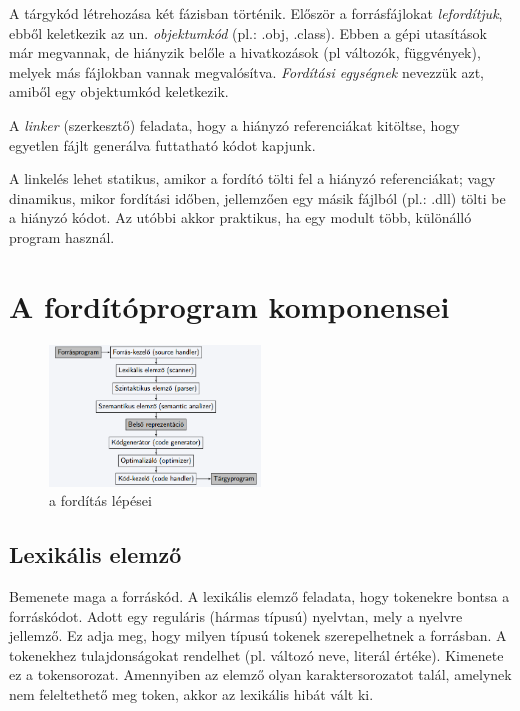 \documentclass[margin=0px]{article}
\begin{document}
	A tárgykód létrehozása két fázisban történik. Először a forrásfájlokat \textit{lefordítjuk}, ebből keletkezik az un. \textit{objektumkód} (pl.: .obj, .class). Ebben a gépi utasítások már megvannak, de hiányzik belőle a hivatkozások (pl változók, függvények), melyek más fájlokban vannak megvalósítva. \textit{Fordítási egységnek} nevezzük azt, amiből egy objektumkód keletkezik.
	
	 A \textit{linker} (szerkesztő) feladata, hogy a hiányzó referenciákat kitöltse, hogy egyetlen fájlt generálva futtatható kódot kapjunk.
	
	 A linkelés lehet statikus, amikor a fordító tölti fel a hiányzó referenciákat; vagy dinamikus, mikor fordítási időben, jellemzően egy másik fájlból (pl.: .dll) tölti be a hiányzó kódot. Az utóbbi akkor praktikus, ha egy modult több, különálló program használ.
	

\section{A fordítóprogram komponensei}	
	\begin{figure}[H]
		\centering
		\includegraphics[width=0.5\textwidth]{img/forditas_teljes_folyamata.png}
		\caption{a fordítás lépései}
		\label{fig:forditas_teljes_folyamatabra}
	\end{figure}


\subsection{Lexikális elemző}
	
	Bemenete maga a forráskód. A lexikális elemző feladata, hogy tokenekre bontsa a forráskódot. Adott egy reguláris (hármas típusú) nyelvtan, mely a nyelvre jellemző. Ez adja meg,  hogy milyen típusú tokenek szerepelhetnek a forrásban. A tokenekhez tulajdonságokat rendelhet (pl. változó neve, literál értéke). Kimenete ez a tokensorozat. Amennyiben az elemző olyan karaktersorozatot talál, amelynek nem feleltethető meg token, akkor az lexikális hibát vált ki.
	
\end{document}
